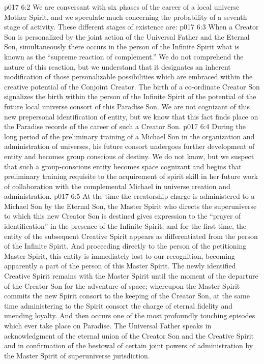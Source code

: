 \vs p017 6:2 \pc We are conversant with six phases of the career of a local universe Mother Spirit, and we speculate much concerning the probability of a seventh stage of activity. These different stages of existence are:
\vs p017 6:3 \bibnobreakspace {} When a Creator Son is personalized by the joint action of the Universal Father and the Eternal Son, simultaneously there occurs in the person of the Infinite Spirit what is known as the “supreme reaction of complement.” We do not comprehend the nature of this reaction, but we understand that it designates an inherent modification of those personalizable possibilities which are embraced within the creative potential of the Conjoint Creator. The birth of a co\hyp{}ordinate Creator Son signalizes the birth within the person of the Infinite Spirit of the potential of the future local universe consort of this Paradise Son. We are not cognizant of this new prepersonal identification of entity, but we know that this fact finds place on the Paradise records of the career of such a Creator Son.
\vs p017 6:4 \pc {}\bibnobreakspace {} During the long period of the preliminary training of a Michael Son in the organization and administration of universes, his future consort undergoes further development of entity and becomes group conscious of destiny. We do not know, but we suspect that such a group\hyp{}conscious entity becomes space cognizant and begins that preliminary training requisite to the acquirement of spirit skill in her future work of collaboration with the complemental Michael in universe creation and administration.
\vs p017 6:5 \pc {}\bibnobreakspace {} At the time the creatorship charge is administered to a Michael Son by the Eternal Son, the Master Spirit who directs the superuniverse to which this new Creator Son is destined gives expression to the “prayer of identification” in the presence of the Infinite Spirit; and for the first time, the entity of the subsequent Creative Spirit appears as differentiated from the person of the Infinite Spirit. And proceeding directly to the person of the petitioning Master Spirit, this entity is immediately lost to our recognition, becoming apparently a part of the person of this Master Spirit. The newly identified Creative Spirit remains with the Master Spirit until the moment of the departure of the Creator Son for the adventure of space; whereupon the Master Spirit commits the new Spirit consort to the keeping of the Creator Son, at the same time administering to the Spirit consort the charge of eternal fidelity and unending loyalty. And then occurs one of the most profoundly touching episodes which ever take place on Paradise. The Universal Father speaks in acknowledgment of the eternal union of the Creator Son and the Creative Spirit and in confirmation of the bestowal of certain joint powers of administration by the Master Spirit of superuniverse jurisdiction.
